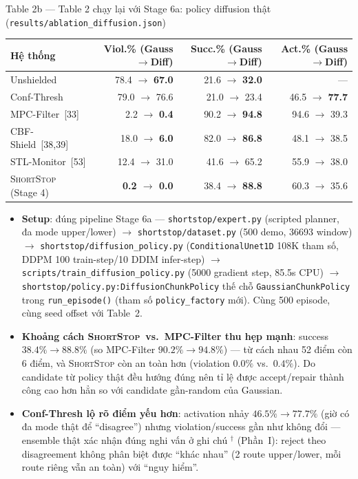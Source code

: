 \documentclass[aspectratio=169]{beamer}
\newcommand{\st}{\textsc{ShortStop}}
\newcommand{\bad}[1]{\textcolor{red!60!black}{#1}}
\begin{document}
\begin{frame}[t,shrink=8]{Table 2b --- Table 2 chạy lại với Stage 6a: policy diffusion thật (\texttt{results/ablation\_diffusion.json})}
\scriptsize
\begin{center}
\begin{tabular}{@{}l r r r@{}}
\toprule
\textbf{Hệ thống} & \textbf{Viol.\% (Gauss$\to$Diff)} & \textbf{Succ.\% (Gauss$\to$Diff)} & \textbf{Act.\% (Gauss$\to$Diff)} \\
\midrule
Unshielded & 78.4 $\to$ \textbf{67.0} & 21.6 $\to$ \textbf{32.0} & --- \\
Conf-Thresh & 79.0 $\to$ 76.6 & 21.0 $\to$ 23.4 & 46.5 $\to$ \textbf{77.7} \\
MPC-Filter~[33] & 2.2 $\to$ \textbf{0.4} & 90.2 $\to$ \textbf{94.8} & 94.6 $\to$ 39.3 \\
CBF-Shield~[38,39] & 18.0 $\to$ \textbf{6.0} & 82.0 $\to$ \textbf{86.8} & 48.1 $\to$ 38.5 \\
STL-Monitor~[53] & 12.4 $\to$ \bad{31.0} & 41.6 $\to$ 65.2 & 55.9 $\to$ 38.0 \\
\st{} (Stage 4) & \textbf{0.2 $\to$ 0.0} & 38.4 $\to$ \textbf{88.8} & 60.3 $\to$ 35.6 \\
\bottomrule
\end{tabular}
\end{center}
\vspace{6pt}
\begin{itemize}
    \item \textbf{Setup}: đúng pipeline Stage 6a --- \texttt{shortstop/expert.py} (scripted planner, đa mode upper/lower) $\to$ \texttt{shortstop/dataset.py} (500 demo, 36693 window) $\to$ \texttt{shortstop/diffusion\_policy.py} (\texttt{ConditionalUnet1D} 108K tham số, DDPM 100 train-step/10 DDIM infer-step) $\to$ \texttt{scripts/train\_diffusion\_policy.py} (5000 gradient step, 85.5s CPU) $\to$ \texttt{shortstop/policy.py:DiffusionChunkPolicy} thế chỗ \texttt{GaussianChunkPolicy} trong \texttt{run\_episode()} (tham số \texttt{policy\_factory} mới). Cùng 500 episode, cùng seed offset với Table~2.
    \item \textbf{Khoảng cách \st{}~vs.~MPC-Filter thu hẹp mạnh}: success $38.4\%\to88.8\%$ (so MPC-Filter $90.2\%\to94.8\%$) --- từ cách nhau 52 điểm còn 6 điểm, và \st{} còn an toàn hơn (violation $0.0\%$ vs.\ $0.4\%$). Do candidate từ policy thật đều hướng đúng nên tỉ lệ được accept/repair thành công cao hơn hẳn so với candidate gần-random của Gaussian.
    \item \textbf{Conf-Thresh lộ rõ điểm yếu hơn}: activation nhảy $46.5\%\to77.7\%$ (giờ có đa mode thật để ``disagree'') nhưng violation/success gần như không đổi --- ensemble thật xác nhận đúng nghi vấn ở ghi chú $^\dagger$ (Phần~I): reject theo disagreement không phân biệt được ``khác nhau'' (2 route upper/lower, mỗi route riêng vẫn an toàn) với ``nguy hiểm''.

\end{itemize}
\end{frame}
\end{document}
